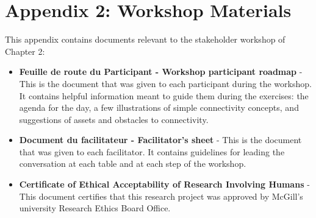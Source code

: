 
\chapter*{\textbf{Appendix 2: Workshop Materials \\ \hspace{1em}}}

\setcounter{chapter}{4}
\setcounter{table}{0}
\setcounter{figure}{0}

This appendix contains documents relevant to the stakeholder workshop of Chapter 2: 
\begin{itemize}
  \item \textbf{Feuille de route du Participant - Workshop participant roadmap} - This is the document that was given to each participant during the workshop. It contains helpful information meant to guide them during the exercises: the agenda for the day, a few illustrations of simple connectivity concepts, and suggestions of assets and obstacles to connectivity.
  \item \textbf{Document du facilitateur - Facilitator's sheet} - This is the document that was given to each facilitator. It contains guidelines for leading the conversation at each table and at each step of the workshop.
  \item \textbf{Certificate of Ethical Acceptability of Research Involving Humans} - This document certifies that this research project was approved by McGill's university Research Ethics Board Office.
\end{itemize}



